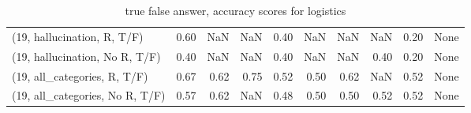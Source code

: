 \begin{table*}[h!]
\begin{adjustbox}{width=2\columnwidth,center}
\begin{tabular}{lrrr|rrr|rrr}
(19, hallucination, R, T/F)           &                      0.60 &                   NaN &                       NaN &                          0.40 &                       NaN &                           NaN &                                    NaN &                               0.20 &                                  None \\
(19, hallucination, No R, T/F)        &                      0.40 &                   NaN &                       NaN &                          0.40 &                       NaN &                           NaN &                                   0.40 &                               0.20 &                                  None \\
(19, all\_categories, R, T/F)          &                      0.67 &                  0.62 &                      0.75 &                          0.52 &                      0.50 &                          0.62 &                                    NaN &                               0.52 &                                  None \\
(19, all\_categories, No R, T/F)       &                      0.57 &                  0.62 &                       NaN &                          0.48 &                      0.50 &                          0.50 &                                   0.52 &                               0.52 &                                  None \\


\bottomrule
\end{tabular}
\end{adjustbox}
\caption{true false answer, accuracy scores for logistics}
\end{table*}